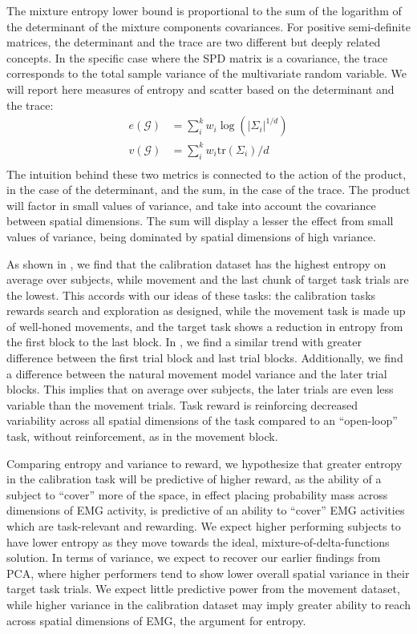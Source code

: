 \documentclass[../main.tex]{subfiles}
\begin{document}
The mixture entropy lower bound is proportional to the sum of the logarithm of the determinant of the mixture components covariances. For positive semi-definite matrices, the determinant and the trace are two different but deeply related concepts. In the specific case where the SPD matrix is a covariance, the trace corresponds to the total sample variance of the multivariate random variable. We will report here measures of entropy and scatter based on the determinant and the trace:
%
\begin{align}
  e(\mathcal{G}) &=  \sum_i^k{w_i \log{(|\Sigma_i|^{1/d})}} \\
  v(\mathcal{G}) &=  \sum_i^k{w_i \mathrm{tr}(\Sigma_i)/d} \\
\end{align}\label{eq:mixture_metrics}
%
The intuition behind these two metrics is connected to the action of the product, in the case of the determinant, and the sum, in the case of the trace. The product will factor in small values of variance, and take into account the covariance between spatial dimensions. The sum will display a lesser the effect from small values of variance, being dominated by spatial dimensions of high variance.

As shown in , we find that the calibration dataset has the highest entropy on average over subjects, while movement and the last chunk of target task trials are the lowest. This accords with our ideas of these tasks: the calibration tasks rewards search and exploration as designed, while the movement task is made up of well-honed movements, and the target task shows a reduction in entropy from the first block to the last block. In , we find a similar trend with greater difference between the first trial block and last trial blocks. Additionally, we find a difference between the natural movement model variance and the later trial blocks. This implies that on average over subjects, the later trials are even less variable than the movement trials. Task reward is reinforcing decreased variability across all spatial dimensions of the task compared to an ``open-loop'' task, without reinforcement, as in the movement block.

Comparing entropy and variance to reward, we hypothesize that greater entropy in the calibration task will be predictive of higher reward, as the ability of a subject to ``cover'' more of the space, in effect placing probability mass across dimensions of EMG activity, is predictive of an ability to ``cover'' EMG activities which are task-relevant and rewarding. We expect higher performing subjects to have lower entropy as they move towards the ideal, mixture-of-delta-functions solution. In terms of variance, we expect to recover our earlier findings from PCA, where higher performers tend to show lower overall spatial variance in their target task trials. We expect little predictive power from the movement dataset, while higher variance in the calibration dataset may imply greater ability to reach across spatial dimensions of EMG, the argument for entropy.
\end{document}
